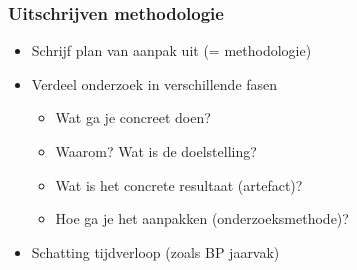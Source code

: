 \documentclass[aspectratio=169]{beamer}
\begin{document}
\begin{frame}
  \frametitle{Uitschrijven methodologie}

  \begin{itemize}
    \item Schrijf plan van aanpak uit (= methodologie)
    \item Verdeel onderzoek in verschillende fasen
          \begin{itemize}
            \item Wat ga je concreet doen?
            \item Waarom? Wat is de doelstelling?
            \item Wat is het concrete resultaat (artefact)?
            \item Hoe ga je het aanpakken (onderzoeksmethode)?
          \end{itemize}
    \item Schatting tijdverloop (zoals BP jaarvak)
  \end{itemize}

\end{frame}
\end{document}
